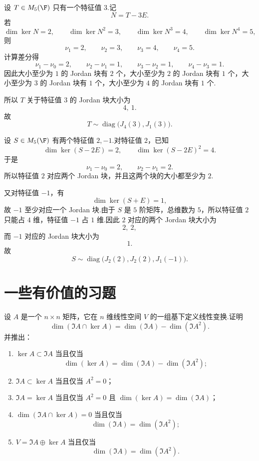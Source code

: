\begin{example}
	设 $T\in M_5(\F)$ 只有一个特征值 $3$.记
	\[
	N=T-3E.
	\]
	若
	\[
	\dim\ker N=2,\qquad
	\dim\ker N^2=3,\qquad
	\dim\ker N^3=4,\qquad
	\dim\ker N^4=5,
	\]
	则
	\[
	\nu_1=2,\qquad \nu_2=3,\qquad \nu_3=4,\qquad \nu_4=5.
	\]
	计算差分得
	\[
	\nu_1-\nu_0=2,\qquad
	\nu_2-\nu_1=1,\qquad
	\nu_3-\nu_2=1,\qquad
	\nu_4-\nu_3=1.
	\]
	因此大小至少为 $1$ 的 Jordan 块有 $2$ 个，大小至少为 $2$ 的 Jordan 块有 $1$ 个，大小至少为 $3$ 的 Jordan 块有 $1$ 个，大小至少为 $4$ 的 Jordan 块有 $1$ 个.
	
	所以 $T$ 关于特征值 $3$ 的 Jordan 块大小为
	\[
	4,\ 1.
	\]
	故
	\[
	T\sim \operatorname{diag}\bigl(J_4(3),J_1(3)\bigr).
	\]
	
\end{example}

\begin{example}
	设 $S\in M_5(\F)$ 有两个特征值 $2,-1$.对特征值 $2$，已知
	\[
	\dim\ker(S-2E)=2,\qquad
	\dim\ker(S-2E)^2=4.
	\]
	于是
	\[
	\nu_1-\nu_0=2,\qquad
	\nu_2-\nu_1=2.
	\]
	所以特征值 $2$ 对应两个 Jordan 块，并且这两个块的大小都至少为 $2$.
	
	又对特征值 $-1$，有
	\[
	\dim\ker(S+E)=1,
	\]
	故 $-1$ 至少对应一个 Jordan 块.由于 $S$ 是 $5$ 阶矩阵，总维数为 $5$，所以特征值 $2$ 只能占 $4$ 维，特征值 $-1$ 占 $1$ 维.因此 $2$ 对应的两个 Jordan 块大小为
	\[
	2,\ 2,
	\]
	而 $-1$ 对应的 Jordan 块大小为
	\[
	1.
	\]
	故
	\[
	S\sim \operatorname{diag}\bigl(J_2(2),J_2(2),J_1(-1)\bigr).
	\]
	
\end{example}


\section{一些有价值的习题}

\begin{problem}[11]
	设 $A$ 是一个 $n\times n$ 矩阵，它在 $n$ 维线性空间 $V$ 的一组基下定义线性变换.证明
	\[
	\dim(\Im A\cap\ker A)=\dim(\Im A)-\dim(\Im A^2).
	\]
	并推出：
	\begin{enumerate}
		\item $\ker A\subset \Im A$ 当且仅当
		\[
		\dim(\ker A)=\dim(\Im A)-\dim(\Im A^2);
		\]
		\item $\Im A\subset \ker A$ 当且仅当 $A^2=0$；
		\item $\Im A=\ker A$ 当且仅当 $A^2=0$ 且 $\dim(\ker A)=\dim(\Im A)$；
		\item $\dim(\Im A\cap\ker A)=0$ 当且仅当
		\[
		\dim(\Im A)=\dim(\Im A^2);
		\]
		\item $V=\Im A\oplus\ker A$ 当且仅当
		\[
		\dim(\Im A)=\dim(\Im A^2).
		\]
	\end{enumerate}
\end{problem}

